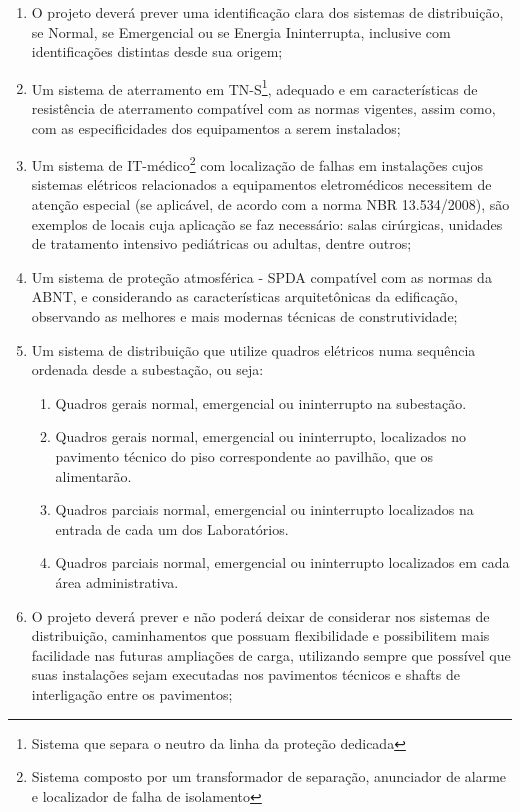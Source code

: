\begin{enumerate}
	\item O projeto deverá prever uma identificação clara dos sistemas de distribuição, se Normal, se Emergencial ou se Energia Ininterrupta, inclusive com identificações distintas desde sua origem;
	
	\item Um sistema de aterramento em TN-S\footnote{Sistema que separa o neutro da linha da proteção dedicada}, adequado e em características de resistência de aterramento compatível com as normas vigentes, assim como, com as especificidades dos equipamentos a serem instalados;
	
	\item Um sistema de IT-médico\footnote{Sistema composto por um transformador de separação, anunciador de alarme e localizador de falha de isolamento} com localização de falhas em instalações cujos sistemas elétricos relacionados a equipamentos eletromédicos necessitem de atenção especial (se aplicável, de acordo com a norma NBR 13.534/2008), são exemplos de locais cuja aplicação se faz necessário: salas cirúrgicas, unidades de tratamento intensivo pediátricas ou adultas, dentre outros; 
	
	\item Um sistema de proteção atmosférica - SPDA compatível com as normas da ABNT, e considerando as características arquitetônicas da edificação, observando as melhores e mais modernas técnicas de construtividade;
	
	\item Um sistema de distribuição que utilize quadros elétricos numa sequência ordenada desde a subestação, ou seja:
		\begin{enumerate}
			\item Quadros gerais normal, emergencial ou ininterrupto na subestação.
			\item Quadros gerais normal, emergencial ou ininterrupto, localizados no pavimento técnico do piso correspondente ao pavilhão, que os alimentarão.
			\item Quadros parciais normal, emergencial ou ininterrupto localizados na entrada de cada um dos Laboratórios.
			\item Quadros parciais normal, emergencial ou ininterrupto localizados em cada área administrativa.
		\end{enumerate}
	
	\item O projeto deverá prever e não poderá deixar de considerar nos sistemas de distribuição, caminhamentos que possuam flexibilidade e possibilitem mais facilidade nas futuras ampliações de carga, utilizando sempre que possível que suas instalações sejam executadas nos pavimentos técnicos e shafts de interligação entre os pavimentos;
	

\end{enumerate}
